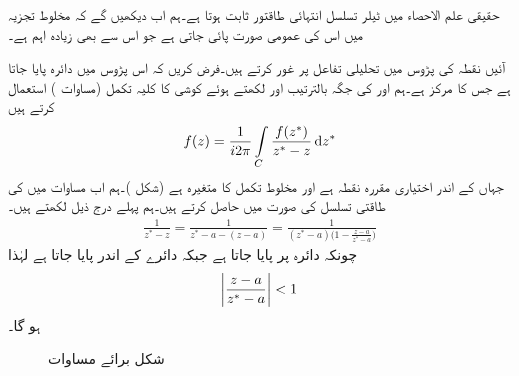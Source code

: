 حقیقی علم الاحصاء میں ٹیلر تسلسل انتہائی طاقتور ثابت ہوتا ہے۔ہم اب دیکھیں گے کہ مخلوط تجزیہ میں اس کی عمومی صورت پائی جاتی ہے جو اس سے بھی زیادہ اہم ہے۔

آئیں نقطہ  کی پڑوس میں تحلیلی تفاعل  پر غور کرتے ہیں۔فرض کریں کہ اس پڑوس میں دائرہ  پایا جاتا ہے جس کا مرکز  ہے۔ہم  اور  کی جگہ بالترتیب  اور  لکھتے ہوئے  کوشی کا کلیہ تکمل (مساوات ) استعمال کرتے ہیں
\begin{align}\label{مساوات_ٹیلر_کوشی_کلیہ_تکمل_ٹیلر_الف}
f(z)=\frac{1}{i2\pi}\int\limits_C\frac{f(z^*)}{z^*-z}\dif z^*
\end{align}
جہاں  کے اندر  اختیاری مقررہ نقطہ ہے اور  مخلوط تکمل کا متغیرہ ہے (شکل )۔ہم اب مساوات  میں  کی طاقتی تسلسل  کی صورت میں حاصل کرتے ہیں۔ہم پہلے درج ذیل لکھتے ہیں۔
\begin{align}\label{مساوات_ٹیلر_کوشی_کلیہ_تکمل_ٹیلر_ب}
\frac{1}{z^*-z}=\frac{1}{z^*-a-(z-a)}=\frac{1}{(z^*-a)\big(1-\frac{z-a}{z^*-a}\big)}
\end{align}
چونکہ  دائرہ  پر پایا جاتا ہے جبکہ  دائرے کے اندر پایا جاتا ہے لہٰذا
\begin{align}\label{مساوات_ٹیلر_کوشی_کلیہ_تکمل_ٹیلر_پ}
\abs{\frac{z-a}{z^*-a}}<1
\end{align}
ہو گا۔
\begin{figure}
\centering
{}
\caption{شکل برائے مساوات }
\label{شکل_مساوات_ٹیلر_کوشی_کلیہ_تکمل_ٹیلر_الف}
\end{figure}

